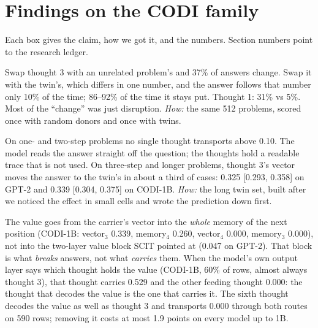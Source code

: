 \documentclass{article}
\begin{document}
\section{Findings on the CODI family}

Each box gives the claim, how we got it, and the numbers. Section numbers point to the research ledger.

\begin{finding}
Swap thought 3 with an unrelated problem's and 37\% of answers change. Swap it with the twin's, which differs in one number, and the answer follows that number only 10\% of the time; 86--92\% of the time it stays put. Thought 1: 31\% vs 5\%. Most of the ``change'' was just disruption. \emph{How:} the same 512 problems, scored once with random donors and once with twins.
\end{finding}

\begin{finding}
On one- and two-step problems no single thought transports above 0.10. The model reads the answer straight off the question; the thoughts hold a readable trace that is not used. On three-step and longer problems, thought 3's vector moves the answer to the twin's in about a third of cases: 0.325 [0.293, 0.358] on GPT-2 and 0.339 [0.304, 0.375] on CODI-1B. \emph{How:} the long twin set, built after we noticed the effect in small cells and wrote the prediction down first.
\end{finding}

\begin{finding}
The value goes from the carrier's vector into the \emph{whole} memory of the next position (CODI-1B: vector$_3$ 0.339, memory$_4$ 0.260, vector$_4$ 0.000, memory$_3$ 0.000), not into the two-layer value block SCIT pointed at (0.047 on GPT-2). That block is what \emph{breaks} answers, not what \emph{carries} them. When the model's own output layer says which thought holds the value (CODI-1B, 60\% of rows, almost always thought 3), that thought carries 0.529 and the other feeding thought 0.000: the thought that decodes the value is the one that carries it. The sixth thought decodes the value as well as thought 3 and transports 0.000 through both routes on 590 rows; removing it costs at most 1.9 points on every model up to 1B.
\end{finding}
\end{document}
